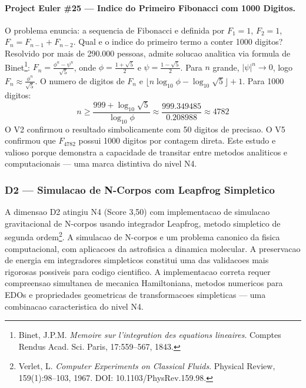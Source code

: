 \paragraph{Project Euler \#25 --- Indice do Primeiro Fibonacci com 1000 Digitos.}

O problema enuncia: a sequencia de Fibonacci e definida por $F_1=1$,
$F_2=1$, $F_n=F_{n-1}+F_{n-2}$. Qual e o indice do primeiro termo
a conter 1000 digitos? Resolvido por mais de 290.000 pessoas, admite
solucao analitica via formula de Binet\footnote{Binet, J.P.M.
\textit{Memoire sur l'integration des equations lineaires}. Comptes
Rendus Acad. Sci. Paris, 17:559--567, 1843.}:
$F_n = \frac{\phi^n - \psi^n}{\sqrt{5}}$, onde $\phi = \frac{1+\sqrt{5}}{2}$
e $\psi = \frac{1-\sqrt{5}}{2}$. Para $n$ grande, $|\psi|^n \to 0$,
logo $F_n \approx \frac{\phi^n}{\sqrt{5}}$. O numero de digitos de
$F_n$ e $\lfloor n \log_{10} \phi - \log_{10} \sqrt{5} \rfloor + 1$.
Para 1000 digitos:
\[
n \geq \frac{999 + \log_{10}\sqrt{5}}{\log_{10}\phi}
\approx \frac{999.349485}{0.208988} \approx 4782
\]
O V2 confirmou o resultado simbolicamente com 50 digitos de precisao.
O V5 confirmou que $F_{4782}$ possui 1000 digitos por contagem direta.
Este estudo e valioso porque demonstra a capacidade de transitar entre
metodos analiticos e computacionais --- uma marca distintiva do nivel N4.

\subsubsection{D2 --- Simulacao de N-Corpos com Leapfrog Simpletico}

A dimensao D2 atingiu N4 (Score 3,50) com implementacao de simulacao
gravitacional de N-corpos usando integrador Leapfrog, metodo simpletico
de segunda ordem\footnote{Verlet, L. \textit{Computer Experiments on
Classical Fluids}. Physical Review, 159(1):98--103, 1967. DOI:
10.1103/PhysRev.159.98.}. A simulacao de N-corpos e um problema
canonico da fisica computacional, com aplicacoes da astrofisica a
dinamica molecular. A preservacao de energia em integradores simpleticos
constitui uma das validacoes mais rigorosas possiveis para codigo
cientifico. A implementacao correta requer compreensao simultanea de
mecanica Hamiltoniana, metodos numericos para EDOs e propriedades
geometricas de transformacoes simpleticas --- uma combinacao
caracteristica do nivel N4.

